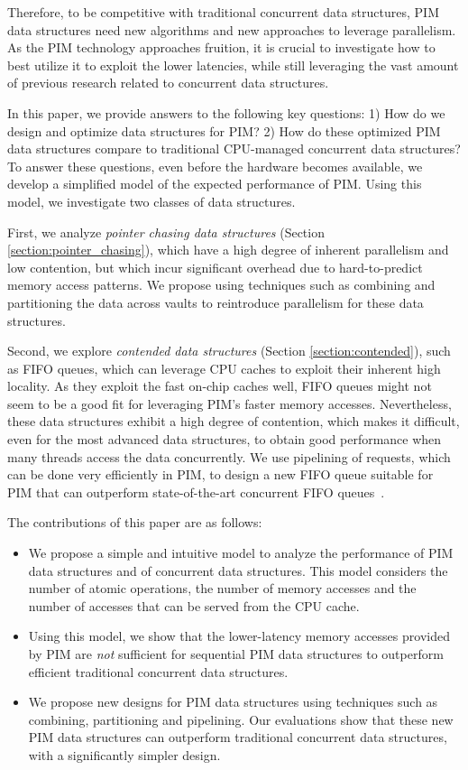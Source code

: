 Therefore, to be competitive with traditional concurrent data
structures, PIM data structures need new algorithms and new approaches
to leverage parallelism.  As the PIM technology approaches fruition,
it is crucial to investigate how to best utilize it to exploit the
lower latencies, while still leveraging the vast amount of previous
research related to concurrent data structures.

In this paper, we provide answers to the following key questions: 1)
How do we design and optimize data structures for PIM? 2) How do these
optimized PIM data structures compare to traditional CPU-managed
concurrent data structures? To answer these questions, even before the
hardware becomes available, we develop a simplified model of the
expected performance of PIM. Using this model, we investigate two
classes of data structures.

First, we analyze \emph{pointer chasing data structures} (Section
\ref{section:pointer_chasing}), which have a high degree of inherent
parallelism and low contention, but which incur significant overhead
due to hard-to-predict memory access patterns.  We propose using
techniques such as combining and partitioning the data across vaults
to reintroduce parallelism for these data structures.

Second, we explore \emph{contended data structures} (Section
\ref{section:contended}), such as FIFO queues, which can leverage CPU
caches to exploit their inherent high locality.  As they exploit the
fast on-chip caches well, FIFO queues might not seem to be a good fit
for leveraging PIM's faster memory accesses.  Nevertheless, these data
structures exhibit a high degree of contention, which makes it
difficult, even for the most advanced data structures, to obtain good
performance when many threads access the data concurrently.  We use
pipelining of requests, which can be done very efficiently in PIM, to
design a new FIFO queue suitable for PIM that can outperform
state-of-the-art concurrent FIFO queues~\cite{Morrison13, Hendler10}.

The contributions of this paper are as follows:
\begin{itemize}
\item We propose a simple and intuitive model to analyze the
  performance of PIM data structures and of concurrent data
  structures. This model considers the number of atomic operations,
  the number of memory accesses and the number of accesses that can be
  served from the CPU cache.
\item Using this model, we show that the lower-latency memory accesses
  provided by PIM are \emph{not} sufficient for sequential PIM data
  structures to outperform efficient traditional concurrent data
  structures.
 \item We propose new designs for PIM data structures using techniques
   such as combining, partitioning and pipelining.  Our evaluations
   show that these new PIM data structures can outperform traditional
   concurrent data structures, with a significantly simpler design.
\end{itemize}

